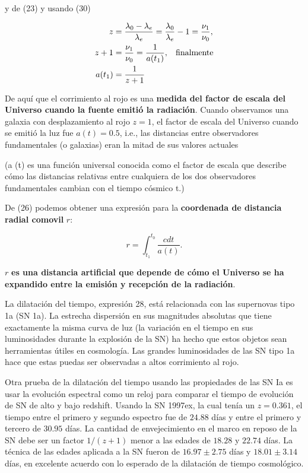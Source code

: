 \documentclass{article}
\begin{document}
y de (23) y usando (30) 

\begin{align}
     z & = \frac{\lambda_0 - \lambda_e}{\lambda_e} = \frac{\lambda_0 }{\lambda_e} - 1 = \frac{\nu_1}{\nu_0}, \\
     z + 1 & = \frac{\nu_1}{\nu_0} = \frac{1}{a(t_1)}, \hspace{0.3cm} \text{finalmente} \\
     a(t_1) & = \frac{1}{z+1}
\end{align}


De aquí que el corrimiento al rojo es una {\bf{medida del factor de escala del Universo cuando la fuente emitió la radiación}}. 
Cuando observamos una galaxia con desplazamiento al rojo $z = 1$, el factor de escala del Universo cuando se emitió la luz fue $a (t) = 0.5$, i.e., las distancias entre observadores fundamentales (o galaxias) eran la mitad de sus valores actuales

(a (t) es una función universal conocida como el factor de escala que describe cómo las distancias relativas entre cualquiera de los dos observadores fundamentales cambian con el tiempo cósmico t.)

De (26) podemos obtener una expresión para la {\bf{coordenada de distancia radial comovil}} $r$:

    \begin{equation}
        r = \int_{t_1}^{t_0}{\frac{c dt }{a (t)}}.
    \end{equation} 

    $r$ {\bf{es una distancia artificial que depende de cómo el Universo se ha expandido entre la emisión y recepción de la radiación}}.

La dilatación del tiempo, expresión 28, está relacionada con las supernovas tipo 1a (SN 1a). La estrecha dispersión en sus magnitudes absolutas que tiene exactamente la misma curva de luz  (la variación en el tiempo en sus luminosidades durante la explosión de la SN) ha hecho que estos objetos sean herramientas útiles en cosmología. Las grandes luminosidades de las SN tipo 1a hace que estas puedas ser observadas a altos corrimiento al rojo. 


Otra prueba de la dilatación del tiempo usando las propiedades de las SN Ia es usar la evolución espectral como un reloj para comparar el tiempo de evolución de SN de alto y bajo redshift. Usando la SN 1997ex, la cual tenía un $z= 0.361$, el tiempo entre el primero y segundo espectro fue de $24.88$ días y entre el primero y tercero de $30.95$ días. La cantidad de envejecimiento en el marco en reposo de la SN debe ser un factor $1/(z+1)$ menor a las edades de $18.28$ y $22.74$ días. La técnica de las edades aplicada a la SN fueron de $16.97 \pm 2.75$ días y $18.01 \pm 3.14$ días, en excelente acuerdo con lo esperado de la dilatación de tiempo cosmológico. 
\end{document}
